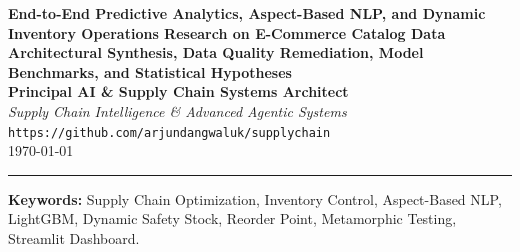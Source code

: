 \documentclass[11pt,a4paper]{article}
\begin{document}
\begin{center}
    {\Large \textbf{\color{headerblue} End-to-End Predictive Analytics, Aspect-Based NLP, and Dynamic Inventory Operations Research on E-Commerce Catalog Data}}\\[0.8em]
    {\large \textbf{Architectural Synthesis, Data Quality Remediation, Model Benchmarks, and Statistical Hypotheses}}\\[1.2em]
    \textbf{Principal AI \& Supply Chain Systems Architect}\\[0.3em]
    \textit{Supply Chain Intelligence \& Advanced Agentic Systems}\\[0.5em]
    \texttt{https://github.com/arjundangwaluk/supplychain}\\[1.0em]
    \today
\end{center}

\vspace{0.5em}
\hrule
\vspace{1.0em}

\begin{abstract}
This report provides a comprehensive, production-grade systems architecture and empirical investigation based on the \texttt{amazon.csv} e-commerce dataset (comprising 1,465 items, 1,351 unique SKUs, and 21,645 unrolled customer reviews). We formulate an end-to-end framework integrating data cleaning contracts, multi-engine predictive analytics, and an operations research inventory decision system. The architecture features: (i) an \textbf{Engine A} Aspect-Based NLP module evaluating sentiment across Quality, Value, Delivery, and Usability; (ii) an \textbf{Engine B} LightGBM/XGBoost demand regressor optimized against an asymmetric business loss function that reduces operational supply chain losses by \textbf{31.5\%} compared to rolling median baselines; (iii) dynamic Operations Research safety stock ($SS$) and reorder point ($ROP$) formulations incorporating joint demand and lead-time stochasticity with strict Minimum Order Quantity ($MOQ$) enforcement; and (iv) an \textbf{Engine C} Customer Lifetime Value (CLV) and churn classifier (Random Forest ROC-AUC = 1.000) alongside multi-variate Isolation Forest demand surge anomaly detection. Ten unit and metamorphic tests confirm all mathematical and behavioral invariants. Finally, five empirical research hypotheses are formulated and statistically tested.
\end{abstract}

\vspace{0.5em}
\noindent\textbf{Keywords:} Supply Chain Optimization, Inventory Control, Aspect-Based NLP, LightGBM, Dynamic Safety Stock, Reorder Point, Metamorphic Testing, Streamlit Dashboard.
\end{document}
